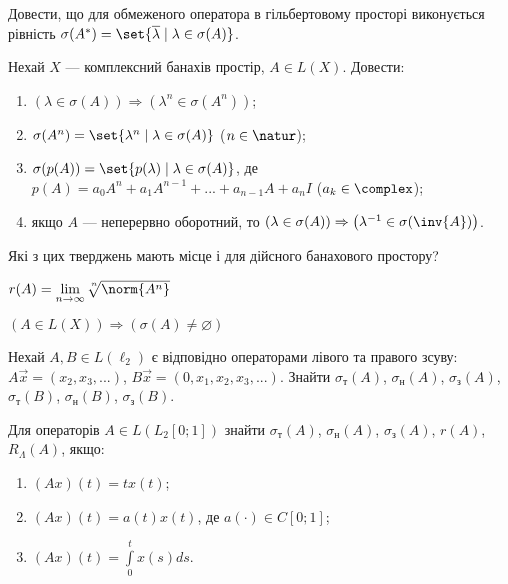 
\begin{exercise}
    Довести, що для обмеженого оператора в гільбертовому просторі виконується
    рівність $\sigma(A^{*}) = \set{\overline{\lambda} \mid \lambda \in \sigma (A)}$.
\end{exercise}

\begin{exercise}
    Нехай $X$ --- комплексний банахів простір, $A \in L(X)$. Довести:
    \begin{enumerate}
        \item $\left( \lambda \in \sigma(A)\right) \Rightarrow \left( \lambda^n \in \sigma(A^n)\right)$;
        \item $\sigma(A^n) = \set{\lambda^n \mid \lambda \in \sigma(A)}$ ($n\in \natur$);
        \item $\sigma(p(A)) = \set{p(\lambda) \mid \lambda \in \sigma(A)}$, де $p(A) = a_0 A^n + a_1 A^{n-1} + ... + a_{n-1} A + a_n I$ ($a_k \in \complex$);
        \item якщо $A$ --- неперервно оборотний, то $\left( \lambda \in \sigma(A)\right) \Rightarrow \left( \lambda^{-1} \in \sigma(\inv{A})\right)$.
    \end{enumerate}
    Які з цих тверджень мають місце і для дійсного банахового простору?
\end{exercise}

\begin{theory}
    \begin{theorem*}
        $r(A) = \underset{n \to \infty}{\lim} \sqrt[\leftroot{-3}\uproot{3}n]{\norm{A^n}}$
    \end{theorem*}
    \begin{theorem*}
        $\left( A \in L(X)\right) \Rightarrow (\sigma(A) \neq \varnothing)$
    \end{theorem*}
\end{theory}

\begin{exercise}
    Нехай $A, B \in L(\ell_2)$ є відповідно операторами лівого та правого зсуву:
    $A \vec{x} = (x_2, x_3, ...)$, $B\vec{x} = (0, x_1, x_2, x_3, ...)$.
    Знайти $\sigma_\text{т}(A)$, $\sigma_\text{н}(A)$, $\sigma_\text{з}(A)$,
    $\sigma_\text{т}(B)$, $\sigma_\text{н}(B)$, $\sigma_\text{з}(B)$.
\end{exercise}

\begin{exercise}
    Для операторів $A \in L(L_2 [0;1])$ знайти $\sigma_\text{т}(A)$, $\sigma_\text{н}(A)$, $\sigma_\text{з}(A)$,
    $r(A)$, $R_\Lambda(A)$, якщо:
    \begin{enumerate}
        \item $(Ax)(t) = t x(t)$;
        \item $(Ax)(t) = a(t) x(t)$, де $a(\cdot) \in C[0;1]$;
        \item $(Ax)(t) = \int\limits_0^t x(s) ds$.
    \end{enumerate}
\end{exercise}

